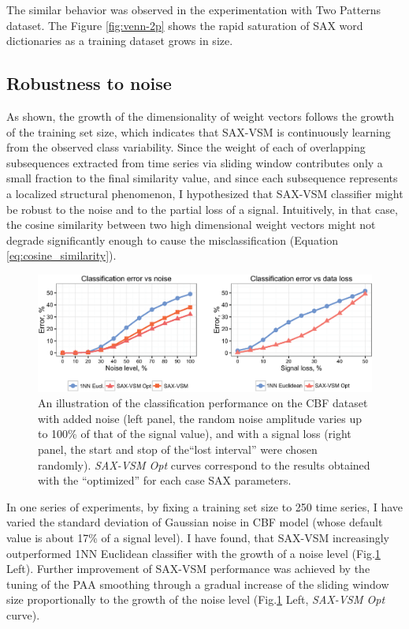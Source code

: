 The similar behavior was observed in the experimentation with Two Patterns dataset. 
The Figure \ref{fig:venn-2p} shows the rapid saturation of SAX word dictionaries as a training dataset grows in size.


\subsection{Robustness to noise}
As shown, the growth of the dimensionality of \tfidf weight vectors follows the growth of the training set size, 
which indicates that SAX-VSM is continuously learning from the observed class variability.
Since the weight of each of overlapping subsequences extracted from time series via sliding window contributes only a 
small fraction to the final similarity value, and since each subsequence represents a localized structural phenomenon,
I hypothesized that SAX-VSM classifier might be robust to the noise and to the partial loss of a signal. 
Intuitively, in that case, the cosine similarity between two high dimensional weight vectors might not degrade significantly 
enough to cause the misclassification (Equation \ref{eq:cosine_similarity}).

\begin{figure}[t]
  \centering
  \includegraphics[width=130mm]{figures/corrupted.eps}
  \caption{An illustration of the classification performance on the CBF dataset with added noise (left panel,
  the random noise amplitude varies up to 100\% of that of the signal value),
  and with a signal loss (right panel, the start and stop of the``lost interval'' were chosen randomly).
  \textit{SAX-VSM Opt} curves correspond to the results obtained with the ``optimized'' for each case 
  SAX parameters.}
  \label{fig:corrupted}
\end{figure}

In one series of experiments, by fixing a training set size to 250 time series, I have varied the standard deviation 
of Gaussian noise in CBF model (whose default value is about 17\% of a signal level). 
I have found, that SAX-VSM increasingly outperformed 1NN Euclidean classifier with the growth of a noise level 
(Fig.\ref{fig:corrupted} Left). 
Further improvement of SAX-VSM performance was achieved by the tuning of the PAA smoothing through a gradual 
increase of the sliding window size proportionally to the growth of the noise level 
(Fig.\ref{fig:corrupted} Left, \textit{SAX-VSM Opt} curve). 


